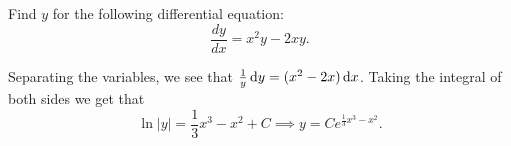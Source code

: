 %
\begin{example}
    Find $y$ for the following differential equation:
    $$\frac{dy}{dx} = x^2y-2xy.$$
\end{example}
\begin{soln}
    Separating the variables, we see that $\frac{1}{y} \dif y = (x^2-2x) \dif x$.
    Taking the integral of both sides we get that
    $$\ln |y| = \frac{1}{3}x^3-x^2 + C \implies y = Ce^{\frac{1}{3}x^3-x^2}.$$
\end{soln}
